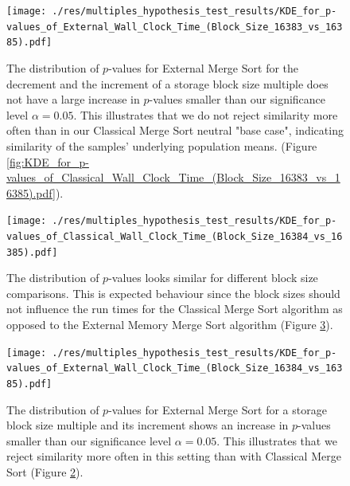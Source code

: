 \documentclass[twocolumn]{article}
\begin{document}
\begin{figure}[htb]
    \begin{minipage}{0.475 \textwidth}
        \centering
        \texttt{[image: ./res/multiples\_hypothesis\_test\_results/KDE\_for\_p-values\_of\_External\_Wall\_Clock\_Time\_(Block\_Size\_16383\_vs\_16385).pdf]}
        \caption{The distribution of \( p \)-values for External Merge Sort for the decrement and the increment of a storage block size multiple does not have a large increase in \( p \)-values
            smaller than our significance level \( \alpha = 0.05 \). This illustrates that we do not reject similarity more often than in our Classical Merge Sort neutral "base case", indicating similarity of the samples' underlying population means.
            (Figure \ref{fig:KDE_for_p-values_of_Classical_Wall_Clock_Time_(Block_Size_16383_vs_16385).pdf}).}
        \label{fig:KDE_for_p-values_of_External_Wall_Clock_Time_(Block_Size_16383_vs_16385).pdf}
    \end{minipage}
\end{figure}

\begin{figure}[htb]
    \begin{minipage}{0.475 \textwidth}
        \centering
        \texttt{[image: ./res/multiples\_hypothesis\_test\_results/KDE\_for\_p-values\_of\_Classical\_Wall\_Clock\_Time\_(Block\_Size\_16384\_vs\_16385).pdf]}
        \caption{The distribution of \( p \)-values looks similar for different block size comparisons. This is expected behaviour since the block sizes should not influence the run times for the Classical Merge
            Sort algorithm as opposed to the External Memory Merge Sort algorithm (Figure \ref{fig:KDE_for_p-values_of_External_Wall_Clock_Time_(Block_Size_16384_vs_16385).pdf}).}
        \label{fig:KDE_for_p-values_of_Classical_Wall_Clock_Time_(Block_Size_16384_vs_16385).pdf}
    \end{minipage}
\end{figure}

\begin{figure}[htb]
    \begin{minipage}{0.475 \textwidth}
        \centering
        \texttt{[image: ./res/multiples\_hypothesis\_test\_results/KDE\_for\_p-values\_of\_External\_Wall\_Clock\_Time\_(Block\_Size\_16384\_vs\_16385).pdf]}
        \caption{The distribution of \( p \)-values for External Merge Sort for a storage block size multiple and its increment shows an increase in \( p \)-values smaller
            than our significance level \( \alpha = 0.05 \). This illustrates that we reject similarity more often in this setting than with Classical Merge Sort (Figure \ref{fig:KDE_for_p-values_of_Classical_Wall_Clock_Time_(Block_Size_16384_vs_16385).pdf}).}
        \label{fig:KDE_for_p-values_of_External_Wall_Clock_Time_(Block_Size_16384_vs_16385).pdf}
    \end{minipage}
\end{figure}
\end{document}
